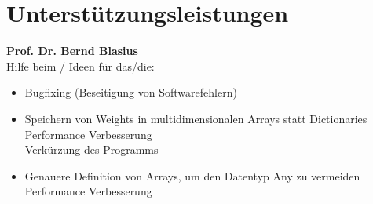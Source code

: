 \documentclass[11pt, a4paper, ngerman]{article}
\begin{document}
\section{Unterstützungsleistungen}

\textbf{Prof. Dr. Bernd Blasius}\\
Hilfe beim / Ideen für das/die:
\begin{itemize}
	\item Bugfixing (Beseitigung von Softwarefehlern)
	\item Speichern von Weights in multidimensionalen Arrays statt Dictionaries\\
	\textrightarrow Performance Verbesserung\\
	\textrightarrow Verkürzung des Programms
	\item Genauere Definition von Arrays, um den Datentyp Any zu vermeiden
	\textrightarrow Performance Verbesserung
\end{itemize}
\end{document}
